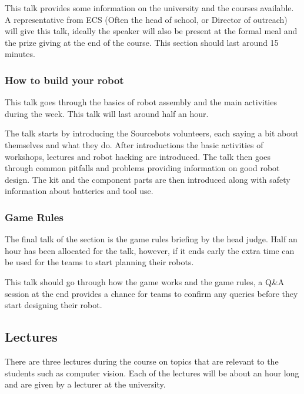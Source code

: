 This talk provides some information on the university and the courses available.
A representative from ECS (Often the head of school, or Director of outreach) will give this talk,
ideally the speaker will also be present at the formal meal and the prize giving at the end of the course.
This section should last around 15 minutes.


\subsubsection{How to build your robot}

This talk goes through the basics of robot assembly and the main activities during the week.
This talk will last around half an hour.

The talk starts by introducing the Sourcebots volunteers, each saying a bit about themselves and what they do.
After introductions the basic activities of workshops, lectures and robot hacking are introduced.
The talk then goes through common pitfalls and problems providing information on good robot design.
The kit and the component parts are then introduced along with safety information about batteries and tool use.

\subsubsection{Game Rules}

The final talk of the section is the game rules briefing by the head judge.
Half an hour has been allocated for the talk, however, if it ends early the extra time can be used for the teams to start planning their robots.

This talk should go through how the game works and the game rules,
a Q\&A session at the end provides a chance for teams to confirm any queries before they start designing their robot.




\subsection{Lectures}

There are three lectures during the course on topics that are relevant to the students such as computer vision.
Each of the lectures will be about an hour long and are given by a lecturer at the university.

